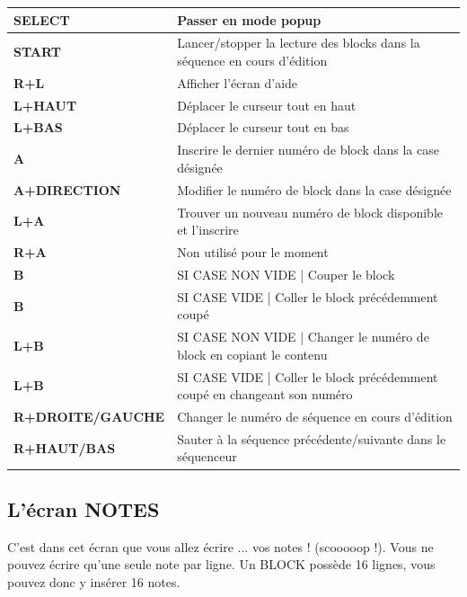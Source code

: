 \documentclass[12pt,a4paper]{article}
\begin{document}
        \begin{supertabular}{|l|p{11cm}|}
        \hline
            {\bf SELECT} & Passer en mode popup \\
            \hline
            {\bf START} & Lancer/stopper la lecture des blocks dans la séquence en cours d'édition \\
            \hline
            {\bf R+L} & Afficher l'écran d'aide \\
            \hline
            {\bf L+HAUT} & Déplacer le curseur tout en haut \\
            \hline
            {\bf L+BAS} & Déplacer le curseur tout en bas \\
            \hline
            {\bf A} & Inscrire le dernier numéro de block dans la case désignée \\
            \hline
            {\bf A+DIRECTION} & Modifier le numéro de block dans la case désignée \\
            \hline
            {\bf L+A} & Trouver un nouveau numéro de block disponible et l'inscrire \\
            \hline
            {\bf R+A} & Non utilisé pour le moment \\
            \hline
            {\bf B} & SI CASE NON VIDE | Couper le block \\
            \hline
            {\bf B} & SI CASE VIDE | Coller le block précédemment coupé \\
            \hline
            {\bf L+B} & SI CASE NON VIDE | Changer le numéro de block en copiant le contenu \\
            \hline
            {\bf L+B} & SI CASE VIDE | Coller le block précédemment coupé en changeant son numéro \\
            \hline
            {\bf R+DROITE/GAUCHE} & Changer le numéro de séquence en cours d'édition \\
            \hline
            {\bf R+HAUT/BAS} & Sauter à la séquence précédente/suivante dans le séquenceur \\
        \hline
        \end{supertabular}
        
    
    \subsection{L'écran NOTES}
    
    C'est dans cet écran que vous allez écrire ... vos notes ! (scooooop !). Vous ne pouvez écrire qu'une seule note par ligne. Un BLOCK possède 16 lignes, vous pouvez donc y insérer 16 notes.\medskip
    
\end{document}
